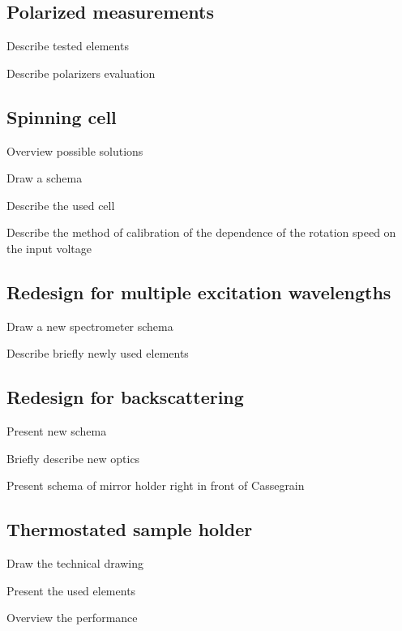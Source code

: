 \subsection{Polarized measurements}
\begin{docitemize}
	\item Describe tested elements
	\item Describe polarizers evaluation
\end{docitemize}


\subsection{Spinning cell}
\begin{docitemize}
	\item Overview possible solutions
	\item Draw a schema
	\item Describe the used cell
	\item Describe the method of calibration of the dependence of the rotation
	speed on the input voltage
\end{docitemize}


\subsection{Redesign for multiple excitation wavelengths}
\begin{docitemize}
	\item Draw a new spectrometer schema
	\item Describe briefly newly used elements
\end{docitemize}


\subsection{Redesign for backscattering}
\begin{docitemize}
	\item Present new schema
	\item Briefly describe new optics
	\item Present schema of mirror holder right in front of Cassegrain
\end{docitemize}


\subsection{Thermostated sample holder}
\begin{docitemize}
	\item Draw the technical drawing
	\item Present the used elements
	\item Overview the performance
\end{docitemize}
